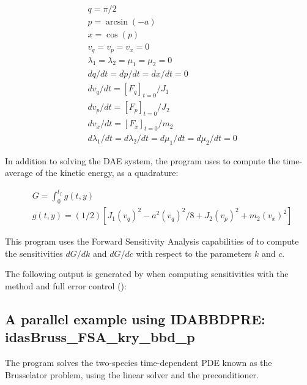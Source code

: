 \begin{equation*}
\begin{split}
  &q = \pi/2 \\
  &p = \arcsin(-a) \\
  &x = \cos(p) \\
  &v_q = v_p = v_x = 0 \\
  &\lambda_1 = \lambda_2 = \mu_1 = \mu_2 = 0 \\
  &dq/dt = dp/dt = dx/dt = 0 \\
  &dv_q/dt = \left[F_q\right]_{t=0} / J_1 \\
  &dv_p/dt = \left[F_p\right]_{t=0} / J_2 \\
  &dv_x/dt = \left[F_x\right]_{t=0} / m_2 \\
  &d\lambda_1/dt = d\lambda_2/dt = d\mu_1/dt = d\mu_2/dt = 0
\end{split}
\end{equation*}

In addition to solving the DAE system, the program uses {\idas} to compute
the time-average of the kinetic energy, as a quadrature:

\begin{equation*}
\begin{split}
  &G = \int_0^{t_f} g(t,y) \\
  &g(t,y) = (1/2)[J_1 (v_q)^2 - a^2 (v_q)^2/8 + J_2 (v_p)^2 + m_2 (v_x)^2 ]
\end{split}
\end{equation*}

This program uses the Forward Sensitivity Analysis capabilities of {\idas}
to compute the sensitivities $dG/dk$ and $dG/dc$ with respect to the
parameters $k$ and $c$.


The following output is generated by  when computing
sensitivities with the  method and full error
control ():




\subsection{A parallel example using IDABBDPRE: idasBruss\_FSA\_kry\_bbd\_p}
\label{ss:idasBruss_FSA_kry_bbd_p}

The  program solves the two-species time-dependent
PDE known as the Brusselator problem, using the {\idaspgmr} linear solver and the
{\idabbdpre} preconditioner.

